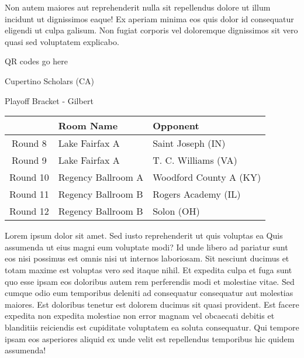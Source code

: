\documentclass{article}%
\begin{document}
\newline%
Non autem maiores aut reprehenderit nulla sit repellendus dolore ut illum incidunt ut dignissimos eaque! Ex aperiam minima eos quis dolor id consequatur eligendi ut culpa galisum. Non fugiat corporis vel doloremque dignissimos sit vero quasi sed voluptatem explicabo.\newline%
\newline%
%
\vspace*{30pt}%
\begin{center}%
\begin{Huge}%
QR codes go here%
\end{Huge}%
\end{center}%
\newpage%
\begin{center}%
\begin{Huge}%
Cupertino Scholars (CA)%
\end{Huge}%
\vspace*{8pt}%
\linebreak%
\begin{Large}%
Playoff Bracket {-} Gilbert%
\end{Large}%
\end{center}%
\begin{tabularx}{\textwidth}{|c|Y|Y|}%
\hline%
&Room Name&Opponent\\%
\hline%
Round 8&Lake Fairfax A&Saint Joseph (IN)\\%
Round 9&Lake Fairfax A&T. C. Williams (VA)\\%
Round 10&Regency Ballroom A&Woodford County A (KY)\\%
Round 11&Regency Ballroom B&Rogers Academy (IL)\\%
Round 12&Regency Ballroom B&Solon (OH)\\%
\hline%
\end{tabularx}%
\vspace*{8pt}%
\linebreak%
\newline%
\newline%
Lorem ipsum dolor sit amet. Sed iusto reprehenderit ut quis voluptas ea Quis assumenda ut eius magni eum voluptate modi? Id unde libero ad pariatur sunt eos nisi possimus est omnis nisi ut internos laboriosam. Sit nesciunt ducimus et totam maxime est voluptas vero sed itaque nihil. Et expedita culpa et fuga sunt quo esse ipsam eos doloribus autem rem perferendis modi et molestiae vitae.\newline%
\newline%
Sed cumque odio eum temporibus deleniti ad consequatur consequatur aut molestias maiores. Est doloribus tenetur est dolorem ducimus sit quasi provident. Est facere expedita non expedita molestiae non error magnam vel obcaecati debitis et blanditiis reiciendis est cupiditate voluptatem ea soluta consequatur. Qui tempore ipsam eos asperiores aliquid ex unde velit est repellendus temporibus hic quidem assumenda!\newline%
\end{document}
